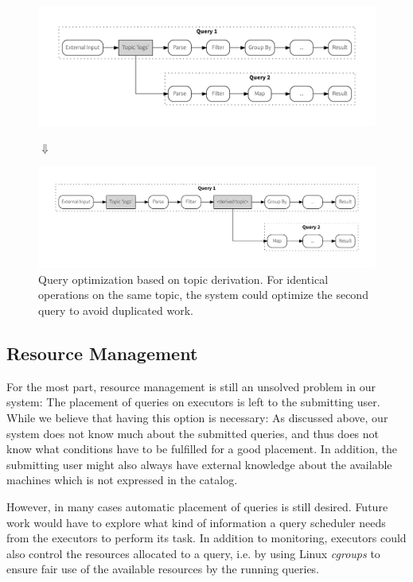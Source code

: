 \begin{figure}[!htb]
  \includegraphics[scale=0.36]{figures/composition/q1q2_man}
  \vspace{-1.5em}
  \begin{center}
  $\Downarrow$
  \end{center}
  \vspace{-1.2em}
  \includegraphics[scale=0.36]{figures/composition/q1q2_auto}
  \caption{Query optimization based on topic derivation. For identical
  operations on the same topic, the system could optimize the second
  query to avoid duplicated work.}
  \label{fig:queryoptimization}
\end{figure}

\subsection{Resource Management}

For the most part, resource management is still an unsolved problem in our
system: The placement of queries on executors is left to the submitting user.
While we believe that having this option is necessary: As discussed above, 
our system does not know much about the submitted queries, and thus does not
know what conditions have to be fulfilled for a good placement. In addition,
the submitting user might also always have external knowledge about the
available machines which is not expressed in the catalog.

However, in many cases automatic placement of queries is still desired. Future
work would have to explore what kind of information a query scheduler needs
from the executors to perform its task. In addition to monitoring, executors
could also control the resources allocated to a query, i.e. by using Linux
\emph{cgroups} \cite{cgroups} to ensure fair use of the available resources
by the running queries.

